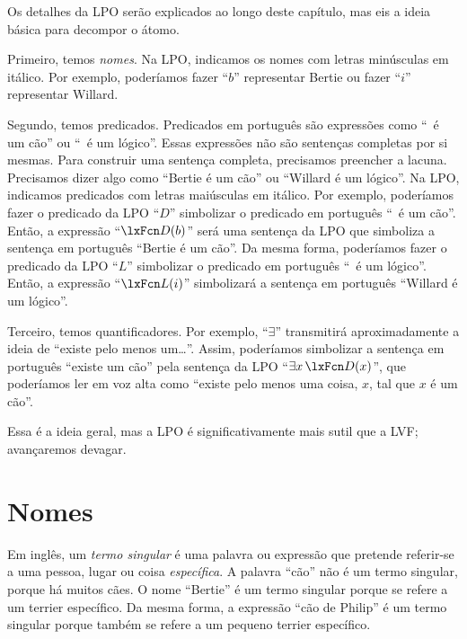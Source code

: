 Os detalhes da LPO serão explicados ao longo deste capítulo, mas eis a ideia básica para decompor o átomo.

Primeiro, temos \emph{nomes}. Na LPO, indicamos os nomes com letras minúsculas em itálico. Por exemplo, poderíamos fazer \textquotedblleft $b$\textquotedblright{} representar Bertie ou fazer \textquotedblleft $i$\textquotedblright{} representar Willard.

Segundo, temos predicados. Predicados em português são expressões como \textquotedblleft\blank\ é um cão\textquotedblright{} ou \textquotedblleft\blank\ é um lógico\textquotedblright{}. Essas expressões não são sentenças completas por si mesmas. Para construir uma sentença completa, precisamos preencher a lacuna. Precisamos dizer algo como \textquotedblleft Bertie é um cão\textquotedblright{} ou \textquotedblleft Willard é um lógico\textquotedblright{}. Na LPO, indicamos predicados com letras maiúsculas em itálico. Por exemplo, poderíamos fazer o predicado da LPO \textquotedblleft $D$\textquotedblright{} simbolizar o predicado em português \textquotedblleft\blank\ é um cão\textquotedblright{}. Então, a expressão \textquotedblleft $\atom{D}{b}$\textquotedblright{} será uma sentença da LPO que simboliza a sentença em português \textquotedblleft Bertie é um cão\textquotedblright{}. Da mesma forma, poderíamos fazer o predicado da LPO \textquotedblleft $L$\textquotedblright{} simbolizar o predicado em português \textquotedblleft\blank\ é um lógico\textquotedblright{}. Então, a expressão \textquotedblleft $\atom{L}{i}$\textquotedblright{} simbolizará a sentença em português \textquotedblleft Willard é um lógico\textquotedblright{}.

Terceiro, temos quantificadores. Por exemplo, \textquotedblleft $\exists$\textquotedblright{} transmitirá aproximadamente a ideia de \textquotedblleft existe pelo menos um\ldots\textquotedblright{}. Assim, poderíamos simbolizar a sentença em português \textquotedblleft existe um cão\textquotedblright{} pela sentença da LPO \textquotedblleft $\exists x\, \atom{D}{x}$\textquotedblright{}, que poderíamos ler em voz alta como \textquotedblleft existe pelo menos uma coisa, $x$, tal que $x$ é um cão\textquotedblright{}.

Essa é a ideia geral, mas a LPO é significativamente mais sutil que a LVF; avançaremos devagar.

\section{Nomes}
Em inglês, um \emph{termo singular} é uma palavra ou expressão que pretende referir-se a uma pessoa, lugar ou coisa \emph{específica}. A palavra \textquotedblleft cão\textquotedblright{} não é um termo singular, porque há muitos cães. O nome \textquotedblleft Bertie\textquotedblright{} é um termo singular porque se refere a um terrier específico. Da mesma forma, a expressão \textquotedblleft cão de Philip\textquotedblright{} é um termo singular porque também se refere a um pequeno terrier específico.

